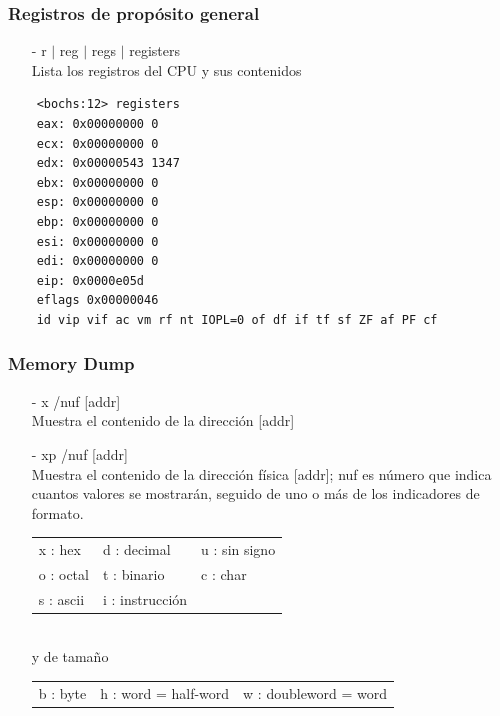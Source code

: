 \documentclass[aspectratio=169]{beamer}
\begin{document}
\begin{frame}[fragile]
    \frametitle{Registros de propósito general}
    \begin{itemize}
    \item[-] r $|$ reg $|$ regs $|$ registers\\
    \textcolor{verdeuca}{Lista los registros del CPU y sus contenidos} %
    \end{itemize}
    \small
    \begin{verbatim}
    <bochs:12> registers
    eax: 0x00000000 0
    ecx: 0x00000000 0
    edx: 0x00000543 1347
    ebx: 0x00000000 0
    esp: 0x00000000 0
    ebp: 0x00000000 0
    esi: 0x00000000 0
    edi: 0x00000000 0
    eip: 0x0000e05d
    eflags 0x00000046
    id vip vif ac vm rf nt IOPL=0 of df if tf sf ZF af PF cf
    \end{verbatim}
\end{frame}

\begin{frame}[fragile]
\frametitle{Memory Dump}
    \begin{itemize}
    \item[-] x  /nuf [addr]\\ \textcolor{verdeuca}{Muestra el contenido de la dirección [addr]} %
    \vspace{0.2cm}
    \item[-] xp /nuf [addr]\\ \textcolor{verdeuca}{Muestra el contenido de la dirección física [addr]; %
            nuf es número que indica cuantos valores se mostrarán, %
            seguido de uno o más de los indicadores de formato.%
            }\\
            \vspace{0.3cm}
            \begin{tabular}{p{2cm}p{2cm}p{2cm}}
            x : hex    & d : decimal & u : sin signo \\
            o : octal  & t : binario & c : char \\
            s : ascii  & i : instrucción & \\
            \end{tabular}\\
            \vspace{0.3cm}
         \textcolor{verdeuca}{y de tamaño}\\
         \vspace{0.3cm}
            \begin{tabular}{p{2cm}p{3cm}p{4cm}}
            b : byte &  h : word = half-word &  w : doubleword = word \\
            \end{tabular}
    \end{itemize}
\end{frame}
\end{document}
